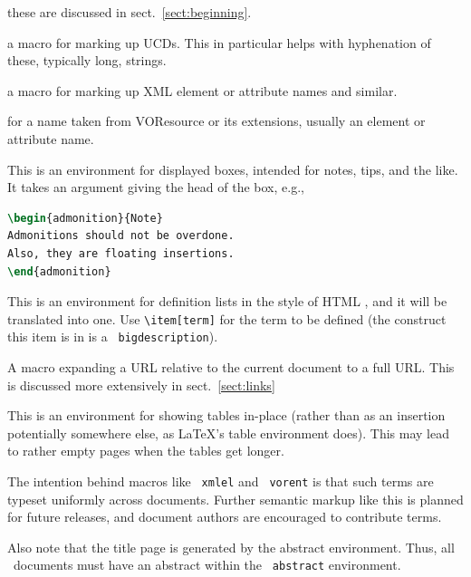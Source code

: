 \documentclass[11pt,a4paper]{ivoa}
\newcommand{\texword}[1]{\texttt{\color{texcolor} #1}}
\begin{document}
\begin{bigdescription}
\item[\texword{author}, \texword{previousversion}, \texword{ivoagroup}] these are discussed
in sect.~\ref{sect:beginning}.
\item[\texword{ucd}] a macro for marking up UCDs.  This in particular
helps with hyphenation of these, typically long, strings.
\item[\texword{xmlel}] a macro for marking up XML element or attribute
names and similar.  
\item[\texword{vorent}] for a name taken from VOResource or its
extensions, usually an
element or attribute name.
\item[\texword{admonition}] This is an environment for 
displayed boxes, intended for notes, tips, and the like.  
It takes an argument giving the head of the box, e.g.,

\begin{lstlisting}[language=TeX]
\begin{admonition}{Note}
Admonitions should not be overdone.  
Also, they are floating insertions.
\end{admonition}
\end{lstlisting}
\item[\texword{bigdescription}] This is an environment for definition
lists in the style of HTML , and it will be translated into
one.  Use \verb|\item[term]| for the term to be defined
(the construct this item is in is a \texword{bigdescription}).
\item[\texword{auxilaryurl}] A macro expanding a URL relative to the
current document to a full URL.  This is discussed more extensively in
sect.~\ref{sect:links}
\item[\texword{inlinetable}] This is an environment for showing tables
in-place (rather than as an insertion potentially somewhere else, as
LaTeX's table environment does).  This may lead to rather empty pages
when the tables get longer.
\end{bigdescription}

The intention behind macros like \texword{xmlel} and \texword{vorent} is
that such terms are typeset uniformly across documents.  Further
semantic markup like this is planned for future releases, and document
authors are encouraged to contribute terms.

Also note that the title page is generated by the abstract environment.
Thus, all \ivoatex\ documents must have an abstract within the
\texword{abstract} environment.
\end{document}
